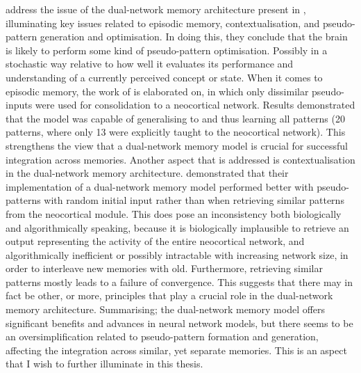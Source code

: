 \cite{French2001} address the issue of the dual-network memory architecture present in \citep{French1997, Ans1997}, illuminating key issues related to episodic memory, contextualisation, and pseudo-pattern generation and optimisation. In doing this, they conclude that the brain is likely to perform some kind of pseudo-pattern optimisation. Possibly in a stochastic way relative to how well it evaluates its performance and understanding of a currently perceived concept or state. When it comes to episodic memory, the work of \cite{Ans2000} is elaborated on, in which only dissimilar pseudo-inputs were used for consolidation to a neocortical network. Results demonstrated that the model was capable of generalising to and thus learning all patterns (20 patterns, where only 13 were explicitly taught to the neocortical network). This strengthens the view that a dual-network memory model is crucial for successful integration across memories. Another aspect that is addressed is contextualisation in the dual-network memory architecture. \cite{Ans2000} demonstrated that their implementation of a dual-network memory model performed better with pseudo-patterns with random initial input rather than when retrieving similar patterns from the neocortical module. This does pose an inconsistency both biologically and algorithmically speaking, because it is biologically implausible to retrieve an output representing the activity of the entire neocortical network, and algorithmically inefficient or possibly intractable with increasing network size, in order to interleave new memories with old. Furthermore, retrieving similar patterns mostly leads to a failure of convergence. This suggests that there may in fact be other, or more, principles that play a crucial role in the dual-network memory architecture. Summarising; the dual-network memory model offers significant benefits and advances in neural network models, but there seems to be an oversimplification related to pseudo-pattern formation and generation, affecting the integration across similar, yet separate memories. This is an aspect that I wish to further illuminate in this thesis.

